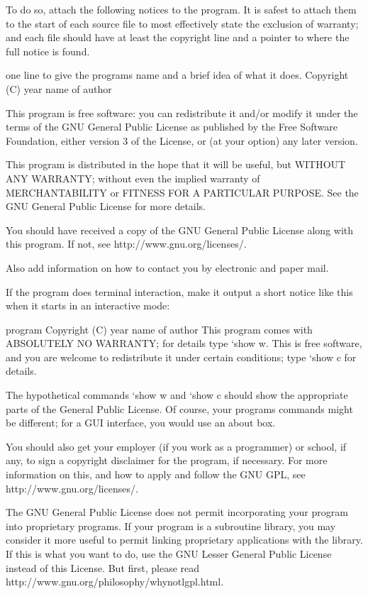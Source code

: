\documentclass[letterpaper,10pt,english]{sphinxmanual}
\begin{document}
\begin{sphinxVerbatim}[commandchars=\\\{\}]
  To do so, attach the following notices to the program.  It is safest
to attach them to the start of each source file to most effectively
state the exclusion of warranty; and each file should have at least
the \PYGZdq{}copyright\PYGZdq{} line and a pointer to where the full notice is found.

    \PYGZlt{}one line to give the program\PYGZsq{}s name and a brief idea of what it does.\PYGZgt{}
    Copyright (C) \PYGZlt{}year\PYGZgt{}  \PYGZlt{}name of author\PYGZgt{}

    This program is free software: you can redistribute it and/or modify
    it under the terms of the GNU General Public License as published by
    the Free Software Foundation, either version 3 of the License, or
    (at your option) any later version.

    This program is distributed in the hope that it will be useful,
    but WITHOUT ANY WARRANTY; without even the implied warranty of
    MERCHANTABILITY or FITNESS FOR A PARTICULAR PURPOSE.  See the
    GNU General Public License for more details.

    You should have received a copy of the GNU General Public License
    along with this program.  If not, see \PYGZlt{}http://www.gnu.org/licenses/\PYGZgt{}.

Also add information on how to contact you by electronic and paper mail.

  If the program does terminal interaction, make it output a short
notice like this when it starts in an interactive mode:

    \PYGZlt{}program\PYGZgt{}  Copyright (C) \PYGZlt{}year\PYGZgt{}  \PYGZlt{}name of author\PYGZgt{}
    This program comes with ABSOLUTELY NO WARRANTY; for details type {}`show w\PYGZsq{}.
    This is free software, and you are welcome to redistribute it
    under certain conditions; type {}`show c\PYGZsq{} for details.

The hypothetical commands {}`show w\PYGZsq{} and {}`show c\PYGZsq{} should show the appropriate
parts of the General Public License.  Of course, your program\PYGZsq{}s commands
might be different; for a GUI interface, you would use an \PYGZdq{}about box\PYGZdq{}.

  You should also get your employer (if you work as a programmer) or school,
if any, to sign a \PYGZdq{}copyright disclaimer\PYGZdq{} for the program, if necessary.
For more information on this, and how to apply and follow the GNU GPL, see
\PYGZlt{}http://www.gnu.org/licenses/\PYGZgt{}.

  The GNU General Public License does not permit incorporating your program
into proprietary programs.  If your program is a subroutine library, you
may consider it more useful to permit linking proprietary applications with
the library.  If this is what you want to do, use the GNU Lesser General
Public License instead of this License.  But first, please read
\PYGZlt{}http://www.gnu.org/philosophy/why\PYGZhy{}not\PYGZhy{}lgpl.html\PYGZgt{}.
\end{sphinxVerbatim}
\end{document}
